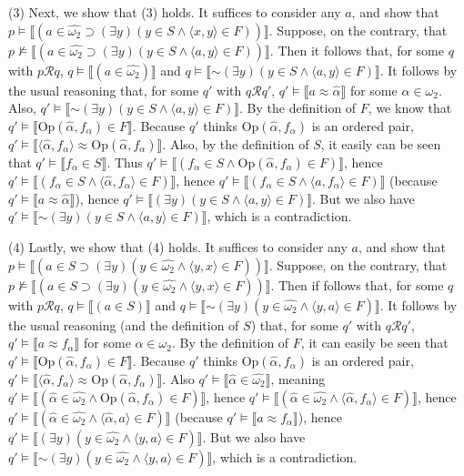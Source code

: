 \documentclass{article}
\newcommand*{\oldneg}{\mathord{\sim}}
\newcommand{\lbc}{\llbracket}
\newcommand{\rbc}{\rrbracket}
\theoremstyle{definition}
\begin{document}
(3) Next, we show that (3) holds. It suffices to consider any $a$, and show that 
$p\vDash\lbc(a\in\widehat{\omega_2}\supset(\exists y)(y\in S\wedge\langle x,y\rangle\in F))\rbc$. Suppose, on the contrary, that 
$p\nvDash\lbc(a\in\widehat{\omega_2}\supset(\exists y)(y\in S\wedge\langle a,y\rangle\in F))\rbc$. Then it follows that, for 
some $q$ with $p\mathcal{R}q$, $q\vDash\lbc(a\in\widehat{\omega_2})\rbc$ and $q\vDash\lbc\oldneg(\exists y)(y\in S\wedge\langle a,y\rangle\in F)\rbc$.
It follows by the usual reasoning that, for some $q'$ with $q\mathcal{R}q'$, 
$q'\vDash\lbc a\approx\hat{\alpha}\rbc$ for some $\alpha\in\omega_2$. Also, $q'\vDash\lbc\oldneg(\exists y)(y\in S\wedge\langle a,y\rangle\in F)\rbc$. By 
the definition of $F$, we know that $q'\vDash\lbc\textrm{Op}(\hat{\alpha},f_\alpha)\in F\rbc$. Because $q'$ thinks 
$\textrm{Op}(\hat{\alpha},f_\alpha)$ is an ordered pair, 
$q'\vDash\lbc\langle\hat{\alpha},f_\alpha\rangle\approx\textrm{Op}(\hat{\alpha},f_\alpha)\rbc$. Also, by the definition of $S$, it easily can be seen that 
$q'\vDash\lbc f_\alpha\in S\rbc$. Thus 
$q'\vDash\lbc (f_\alpha\in S\wedge\textrm{Op}(\hat{\alpha},f_\alpha)\in F)\rbc$, hence
$q'\vDash\lbc (f_\alpha\in S\wedge\langle\hat{\alpha},f_\alpha\rangle\in F)\rbc$, hence
$q'\vDash\lbc (f_\alpha\in S\wedge\langle a,f_\alpha\rangle\in F)\rbc$ (because $q'\vDash\lbc a\approx\hat{\alpha}\rbc$), hence
$q'\vDash\lbc(\exists y)(y\in S\wedge\langle a,y\rangle\in F)\rbc$. But we also have 
$q'\vDash\lbc\oldneg(\exists y)(y\in S\wedge\langle a,y\rangle\in F)\rbc$, which is a contradiction.

(4) Lastly, we show that (4) holds. It suffices to consider any $a$, and show that
$p\vDash\lbc(a\in S\supset(\exists y)(y\in\widehat{\omega_2}\wedge\langle y,x\rangle\in F))\rbc$. Suppose, on the contrary, that
$p\nvDash\lbc(a\in S\supset(\exists y)(y\in\widehat{\omega_2}\wedge\langle y,x\rangle\in F))\rbc$. Then if follows that, for 
some $q$ with $p\mathcal{R}q$, $q\vDash\lbc(a\in S)\rbc$ and $q\vDash\lbc\oldneg(\exists y)(y\in\widehat{\omega_2}\wedge\langle y,a\rangle\in F)\rbc$.
It follows by the usual reasoning (and the definition of $S$) that, 
for some $q'$ with $q\mathcal{R}q'$, $q'\vDash\lbc a\approx f_\alpha\rbc$ for some $\alpha\in\omega_2$. By the definition of 
$F$, it can easily be seen that $q'\vDash\lbc\textrm{Op}(\hat{\alpha},f_\alpha)\in F\rbc$. Because $q'$ thinks 
$\textrm{Op}(\hat{\alpha},f_\alpha)$ is an ordered pair, $q'\vDash\lbc\langle\hat{\alpha},f_\alpha\rangle\approx\textrm{Op}(\hat{\alpha},f_\alpha)\rbc$. 
Also $q'\vDash\lbc\hat{\alpha}\in\widehat{\omega_2}\rbc$, meaning 
$q'\vDash\lbc (\hat{\alpha}\in\widehat{\omega_2}\wedge\textrm{Op}(\hat{\alpha},f_\alpha)\in F)\rbc$, hence
$q'\vDash\lbc (\hat{\alpha}\in\widehat{\omega_2}\wedge\langle\hat{\alpha},f_\alpha\rangle\in F)\rbc$, hence
$q'\vDash\lbc (\hat{\alpha}\in\widehat{\omega_2}\wedge\langle\hat{\alpha},a\rangle\in F)\rbc$ (because 
$q'\vDash\lbc a\approx f_\alpha\rbc$), hence
$q'\vDash\lbc(\exists y)(y\in\widehat{\omega_2}\wedge\langle y,a\rangle\in F)\rbc$. But we also have 
$q'\vDash\lbc\oldneg(\exists y)(y\in\widehat{\omega_2}\wedge\langle y,a\rangle\in F)\rbc$, which is a contradiction.
\end{document}
